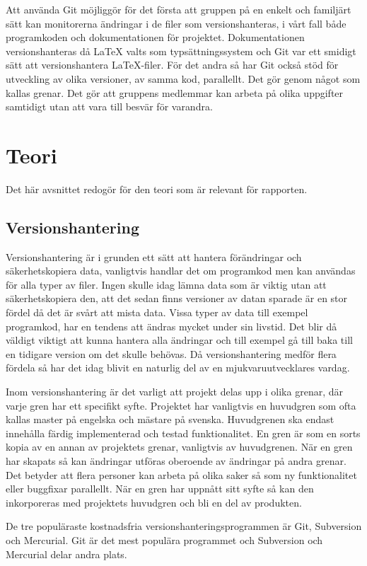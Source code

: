 Att använda Git möjliggör för det första att gruppen på en enkelt och familjärt sätt kan monitorerna ändringar i de filer som versionshanteras, i vårt fall både programkoden och dokumentationen för projektet. Dokumentationen versionshanteras då LaTeX valts som typsättningssystem och Git var ett smidigt sätt att versionshantera LaTeX-filer. För det andra så har Git också stöd för utveckling av olika versioner, av samma kod, parallellt. Det gör genom något som kallas grenar. Det gör att gruppens medlemmar kan arbeta på olika uppgifter samtidigt utan att vara till besvär för varandra.


\section{Teori}
Det här avsnittet redogör för den teori som är relevant för rapporten.
\subsection{Versionshantering}
Versionshantering är i grunden ett sätt att hantera förändringar och säkerhetskopiera data, vanligtvis handlar det om programkod men kan användas för alla typer av filer. Ingen skulle idag lämna data som är viktig utan att säkerhetskopiera den, att det sedan finns versioner av datan sparade är en stor fördel då det är svårt att mista data. Vissa typer av data till exempel programkod, har en tendens att ändras mycket under sin livstid. Det blir då väldigt viktigt att kunna hantera alla ändringar och till exempel gå till baka till en tidigare version om det skulle behövas. Då versionshantering medför flera fördela så har det idag blivit en naturlig del av en mjukvaruutvecklares vardag.\cite{VersionControlGit}

Inom versionshantering är det varligt att projekt delas upp i olika grenar, där varje gren har ett specifikt syfte. Projektet har vanligtvis en huvudgren som ofta kallas master på engelska och mästare på svenska. Huvudgrenen ska endast innehålla färdig implementerad och testad funktionalitet.
En gren är som en sorts kopia av en annan av projektets grenar, vanligtvis av huvudgrenen. När en gren har skapats så kan ändringar utföras oberoende av ändringar på andra grenar. Det betyder att flera personer kan arbeta på olika saker så som ny funktionalitet eller buggfixar parallellt. När en gren har uppnått sitt syfte så kan den inkorporeras med projektets huvudgren och bli en del av produkten.

De tre populäraste kostnadsfria versionshanteringsprogrammen är Git, Subversion och Mercurial. Git är det mest populära programmet och Subversion och Mercurial delar andra plats.\cite{version_comp}
